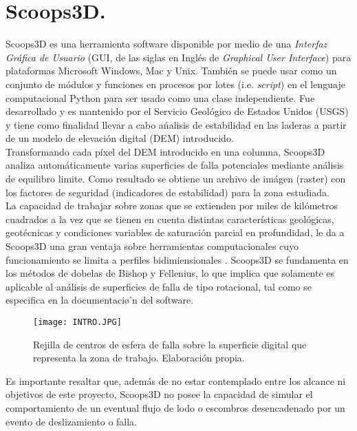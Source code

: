 \chapter{Scoops3D.}
\label{chap_Scoops3d}

Scoops3D es una herramienta software disponible por medio de una \emph{Interfaz Gr\'afica de Usuario} (GUI, de las siglas en Ingl\'es de \textit{Graphical User Interface}) para plataformas Microsoft Windows, Mac y Unix. Tambi\'en se puede usar como un conjunto de m\'odulos y funciones en procesos por lotes (i.e. \textit{script}) en el lenguaje computacional Python para ser usado como una clase independiente. Fue desarrollado y es mantenido por el Servicio Geol\'ogico de Estados Unidos (USGS) y tiene como finalidad llevar a cabo a\'nalisis de estabilidad en las laderas a partir de un modelo de elevaci\'on digital (DEM) introducido. \cite{columnsscoops} \\

Transformando cada p\'ixel del DEM introducido en una columna, Scoops3D analiza autom\'aticamente varias superficies de falla potenciales mediante an\'alisis de equilibro limite.  Como resultado se obtiene un archivo de im\'agen (raster) con los factores de seguridad (indicadores de estabilidad) para la zona estudiada. \cite{fseg} \\

La capacidad de trabajar sobre zonas que se extienden por miles de kil\'ometros cuadrados a la vez que se tienen en cuenta distintas caracter\'isticas geol\'ogicas, geot\'ecnicas y condiciones variables de saturaci\'on parcial en profundidad, le da a Scoops3D una gran ventaja sobre herramientas computacionales cuyo funcionamiento se limita a perfiles bidimiensionales \cite{albataineh2006slope}.
Scoops3D se fundamenta en los m\'etodos de dobelas de Bishop y Fellenius, lo que implica que solamente es aplicable al an\'alisis de superficies de falla de tipo rotacional, tal como se especifica en la documentaci\o'n del software. \cite{rotacional}

\begin{figure}[H]
\centering
\texttt{[image: INTRO.JPG]}
\caption{Rejilla de centros de esfera de falla sobre la superficie digital que representa la zona de trabajo. Elaboraci\'on propia.}
\end{figure}
Es importante resaltar que, adem\'as de no estar contemplado entre los alcance ni objetivos de este proyecto, Scoops3D no posee la capacidad de simular el comportamiento de un eventual flujo de lodo o escombros desencadenado por un evento de deslizamiento o falla. 
